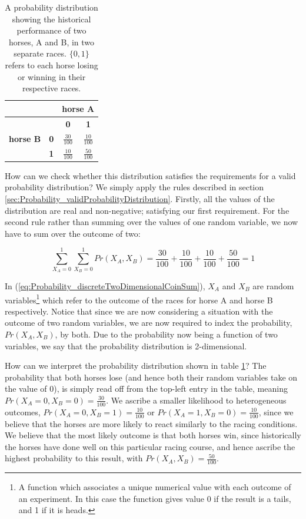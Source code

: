 \documentclass[11pt,fullpage]{book}
\begin{document}
\begin{table}[htbp]
  \centering
    \begin{tabular}{rrcc}
    \toprule
          &       & \multicolumn{2}{c}{\textbf{horse A}} \\
    \midrule
          &       & \textbf{0} & \textbf{1} \\
    \multicolumn{1}{c}{\textbf{horse B}} & \multicolumn{1}{c}{\textbf{0}} & $\frac{30}{100}$   & $\frac{10}{100}$ \\
    \multicolumn{1}{c}{} & \multicolumn{1}{c}{\textbf{1}} & $\frac{10}{100}$   & $\frac{50}{100}$ \\
    \bottomrule
    \end{tabular}%
  \caption{A probability distribution showing the historical performance of two horses, A and B, in two separate races. $\{0,1\}$ refers to each horse losing or winning in their respective races.}\label{tab:Probability_coinBiased}
\end{table}

How can we check whether this distribution satisfies the requirements for a valid probability distribution? We simply apply the rules described in section \ref{sec:Probability_validProbabilityDistribution}. Firstly, all the values of the distribution are real and non-negative; satisfying our first requirement. For the second rule rather than summing over the values of one random variable, we now have to sum over the outcome of two:

\begin{equation}\label{eq:Probability_discreteTwoDimensionalCoinSum}
\sum\limits_{X_A=0}^{1}\sum\limits_{X_B=0}^{1} Pr(X_A,X_B) = \frac{30}{100} + \frac{10}{100}  + \frac{10}{100}  + \frac{50}{100}  = 1
\end{equation}

In (\ref{eq:Probability_discreteTwoDimensionalCoinSum}), $X_A$ and $X_B$ are random variables\footnote{A function which associates a unique numerical value with each outcome of an experiment. In this case the function gives value 0 if the result is a tails, and 1 if it is heads.} which refer to the outcome of the races for horse A and horse B respectively. Notice that since we are now considering a situation with the outcome of two random variables, we are now required to index the probability, $Pr(X_A,X_B)$, by both. Due to the probability now being a function of two variables, we say that the probability distribution is 2-dimensional.

How can we interpret the probability distribution shown in table \ref{tab:Probability_coinBiased}? The probability that both horses lose (and hence both their random variables take on the value of 0), is simply read off from the top-left entry in the table, meaning $Pr(X_A=0,X_B=0)=\frac{30}{100}$. We ascribe a smaller likelihood to heterogeneous outcomes, $Pr(X_A=0,X_B=1)=\frac{10}{100}$ or $Pr(X_A=1,X_B=0)=\frac{10}{100}$, since we believe that the horses are more likely to react similarly to the racing conditions. We believe that the most likely outcome is that both horses win, since historically the horses have done well on this particular racing course, and hence ascribe the highest probability to this result, with $Pr(X_A,X_B)=\frac{50}{100}$.
\end{document}
